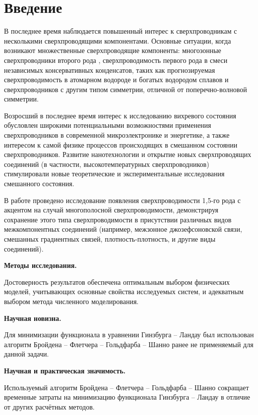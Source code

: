 \chapter*{Введение}

В последнее время наблюдается повышенный интерес к сверхпроводникам с 
несколькими сверхпроводящими компонентами. Основные ситуации, когда возникают 
множественные сверхпроводящие компоненты: многозонные сверхпроводники второго 
рода \cite{bib:6,bib:7,bib:8,bib:9,bib:10,bib:11}, сверхпроводимость первого 
рода в смеси независимых консервативных конденсатов, таких как прогнозируемая 
сверхпроводимость в атомарном водороде и богатых водородом сплавов 
\cite{bib:12.1,bib:12.2,bib:13,bib:14} и сверхпроводников с другим типом 
симметрии, отличной от поперечно-волновой симметрии.

Возросший в последнее время интерес к исследованию вихревого состояния 
обусловлен широкими потенциальными возможностями применения сверхпроводников в 
современной микроэлектронике и энергетике, а также интересом к самой физике 
процессов происходящих в смешанном состоянии сверхпроводников. Развитие 
нанотехнологии и открытие новых сверхпроводящих соединений (в частности, 
высокотемпературных сверхпроводников) стимулировали новые теоретические и
экспериментальные исследования смешанного состояния. 

В работе проведено исследование появления сверхпроводимости 1,5-го рода с 
акцентом на случай многополосной сверхпроводимости, демонстрируя сохранение 
этого типа сверхпроводимости в присутствии различных видов межкомпонентных 
соединений (например, межзонное джозефсоновской связи, смешанных градиентных 
связей, плотность-плотность, и другие виды соединений).

\textbf{Методы исследования.}

Достоверность результатов обеспечена оптимальным выбором физических моделей, 
учитывающих основные свойства исследуемых систем, и адекватным выбором метода 
численного моделирования.

\textbf{Научная новизна.}

Для минимизации функционала в уравнении Гинзбурга -- Ландау был использован 
алгоритм Бройдена -- Флетчера -- Гольдфарба -- Шанно ранее не применяемый для 
данной задачи.

\textbf{Научная и практическая значимость.}

Используемый алгоритм Бройдена -- Флетчера -- Гольдфарба -- Шанно сокращает 
временные затраты на минимизацию функционала Гинзбурга -- Ландау в отличие от 
других расчётных методов.

\newpage